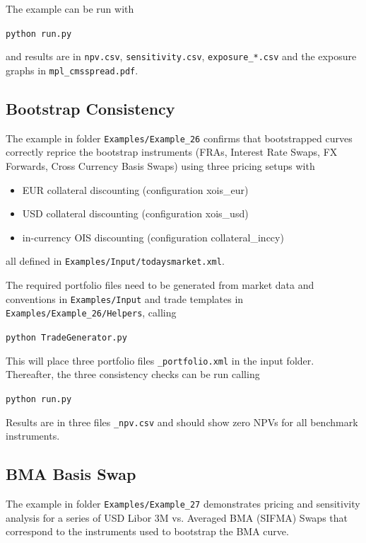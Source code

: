 \documentclass[12pt, a4paper]{article}
\begin{document}
{The example can be run with

\medskip
\centerline{\tt python run.py}

\medskip
and results are in {\tt npv.csv}, {\tt sensitivity.csv}, {\tt exposure\_*.csv} 
and the exposure graphs in {\tt mpl\_cmsspread.pdf}.

\subsection{Bootstrap Consistency}%

The example in folder {\tt Examples/Example\_26} confirms that bootstrapped curves 
correctly reprice the bootstrap instruments (FRAs, Interest Rate Swaps, FX Forwards, Cross
Currency Basis Swaps) using three pricing setups with
\begin{itemize}
\item EUR collateral discounting (configuration xois\_eur)
\item USD collateral discounting (configuration xois\_usd)
\item in-currency OIS discounting (configuration collateral\_inccy)
\end{itemize}
all defined in {\tt Examples/Input/todaysmarket.xml}.

\medskip
The required portfolio files need to be generated from market data and conventions in
{\tt Examples/Input} and trade templates in 
{\tt Examples/Example\_26/Helpers}, calling

\medskip
\centerline{\tt python TradeGenerator.py}

\medskip
This will place three portfolio files {\tt *\_portfolio.xml} in the input folder.
Thereafter, the three consistency checks can be run calling

\medskip
\centerline{\tt python run.py}

\medskip
Results are in three files {\tt *\_npv.csv} and should show zero NPVs for all benchmark instruments.

\subsection{BMA Basis Swap}%
\label{example:27}

The example in folder {\tt Examples/Example\_27} demonstrates pricing 
and sensitivity analysis for a series of USD Libor 3M vs. Averaged BMA (SIFMA) 
Swaps that correspond to the instruments used to bootstrap the BMA curve. 

}
\end{document}
